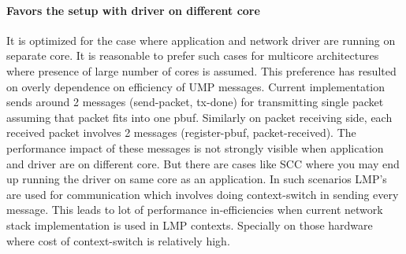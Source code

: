 \documentclass[a4paper,twoside]{report} %
\begin{document}
\paragraph{Favors the setup with driver on different core}
It is optimized for the case where application and network driver are
running on separate core.  It is reasonable to prefer such cases 
for multicore architectures where presence of large number of cores is
assumed.  This preference has resulted on overly dependence on
efficiency of UMP messages.  Current implementation sends around 2
messages (send-packet, tx-done) for transmitting single packet
assuming that packet fits into one pbuf.  Similarly on packet
receiving side, each received packet involves 2 messages 
(register-pbuf, packet-received).  The performance impact of these
messages is not strongly visible when application and driver are on
different core.  But there are cases like SCC where you may end up
running the driver on same core as an application.  In such scenarios
LMP's are used for communication which involves doing context-switch in
sending every message. This leads to lot of performance
in-efficiencies when current network stack implementation is used in
LMP contexts.  Specially on those hardware where cost of
context-switch is relatively high.




\end{document}

